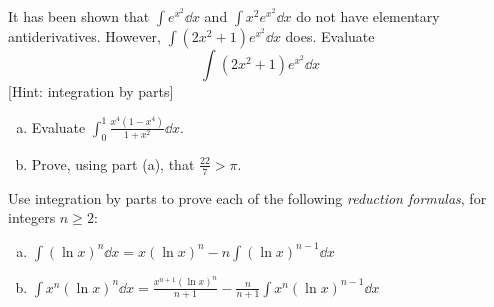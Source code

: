 \documentclass{agony}
\begin{document}
\begin{prob}
  It has been shown that $\int e^{x^2} \dd{x}$ and $\int x^2 e^{x^2} \dd{x}$
  do not have elementary antiderivatives.
  However, $\int (2x^2 + 1)e^{x^2} \dd{x}$ does.
  Evaluate \[ \int(2x^2 + 1)e^{x^2} \dd{x} \]
  [Hint: integration by parts]
\end{prob}

\begin{prob}
  \begin{enumerate}[(a)]
    \item Evaluate $\displaystyle\int_0^1 \frac{x^4(1-x^4)}{1+x^2} \dd{x}$.
    \item Prove, using part (a), that $\frac{22}{7} > \pi$.
  \end{enumerate}
\end{prob}

\begin{prob}
  Use integration by parts to prove each of the following
  \emph{reduction formulas}, for integers $n \geq 2$:
\end{prob}
\begin{enumerate}[(a)]
  \item $\displaystyle\int (\ln x)^n \dd{x}
          = x(\ln x)^n - n\int (\ln x)^{n-1} \dd{x}$
  \item $\displaystyle\int x^n(\ln x)^n \dd{x}
          = \frac{x^{n+1}(\ln x)^n}{n+1}
          - \frac{n}{n+1}\int x^n(\ln x)^{n-1} \dd{x}$
\end{enumerate}
\end{document}
